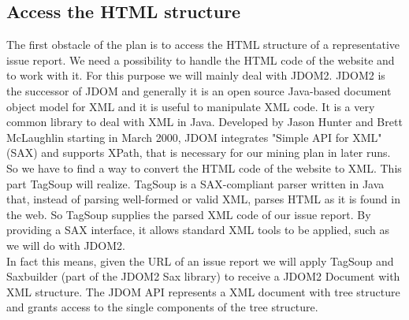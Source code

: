 \subsection{Access the HTML structure}
The first obstacle of the plan is to access the HTML structure of a representative issue report. We need a possibility to handle the HTML code of the website and to work with it. For this purpose we will mainly deal with JDOM2. JDOM2 is the successor of JDOM and generally it is an open source Java-based document object model for XML and it is useful to manipulate XML code. It is a very common library to deal with XML in Java. Developed by Jason Hunter and Brett McLaughlin starting in March 2000, JDOM integrates "Simple API for XML" (SAX) and supports XPath, that is necessary for our mining plan in later runs. \\ So we have to find a way to convert the HTML code of the website to XML. This part TagSoup will realize. TagSoup is a SAX-compliant parser written in Java that, instead of parsing well-formed or valid XML, parses HTML as it is found in the web. So TagSoup supplies the parsed XML code of our issue report. By providing a SAX interface, it allows standard XML tools to be applied, such as we will do with JDOM2. \\ In fact this means, given the URL of an issue report we will apply TagSoup and Saxbuilder (part of the JDOM2 Sax library) to receive a JDOM2 Document with XML structure. The JDOM API represents a XML document with tree structure and grants access to the single components of the tree structure. 